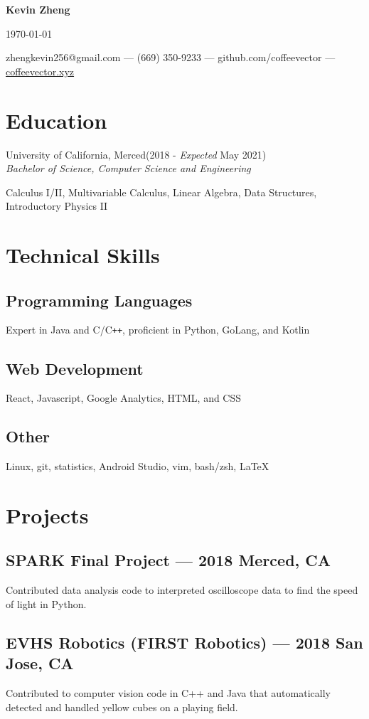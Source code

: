 \documentclass[letterpaper,12pt]{article}
\makeatletter
\newcommand\textbox[1]{%
	\parbox{.333\textwidth}{#1}%
}
\renewcommand{\maketitle}{
	\begin{center}
		\noindent\textbox{\hfill}\textbox{\hfil\bfseries\huge Kevin Zheng\hfil}\textbox{\hfill \today}
		{zhengkevin256@gmail.com --- (669) 350-9233 --- github.com/coffeevector --- \underline{\color{blue}coffeevector.xyz}}
	\end{center} }
\makeatother
\begin{document}
\maketitle
\section{Education}
University of California, Merced\null\hfill(2018 - \emph{Expected} May 2021)\\
\emph{Bachelor of Science, Computer Science and Engineering}
\begin{center}
	Calculus I/II, Multivariable Calculus, Linear Algebra, Data Structures, Introductory Physics II
\end{center}
\section{Technical Skills}
	\subsection{Programming Languages}
	Expert in Java and C/C\verb!++!, proficient in Python, GoLang, and Kotlin
	\vspace*{-2mm}
	\subsection{Web Development}
	React, Javascript, Google Analytics, HTML, and CSS
	\vspace*{-2mm}
	\subsection{Other}
	Linux, git, statistics, Android Studio, vim, bash/zsh, {\LaTeX}
\section{Projects}
	\subsection{SPARK Final Project --- 2018 \null\hfill Merced, CA}
	\par Contributed data analysis code to interpreted oscilloscope data to find the speed of light in Python.
	\vspace*{-2mm}
	\subsection{EVHS Robotics (FIRST Robotics) --- 2018 \null\hfill San Jose, CA}
	\par Contributed to computer vision code in C++ and Java that automatically detected and handled yellow cubes on a playing field.
	\vspace*{-2mm}
\end{document}
